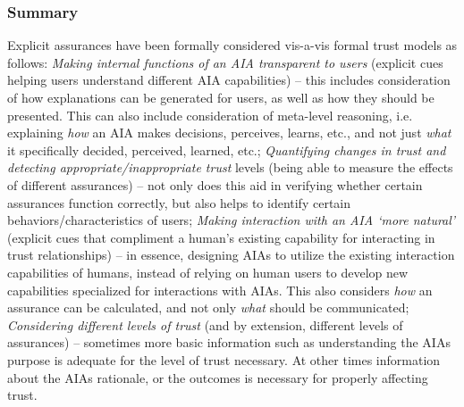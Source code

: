 \subsubsection{Summary}
Explicit assurances have been formally considered vis-a-vis formal trust models as follows: \textit{Making internal functions of an AIA transparent to users} (explicit cues helping users understand different AIA capabilities) -- this includes consideration of how explanations can be generated for users, as well as how they should be presented. This can also include consideration of meta-level reasoning, i.e. explaining \textit{how} an AIA makes decisions, perceives, learns, etc., and not just \textit{what} it specifically decided, perceived, learned, etc.; 
\textit{Quantifying changes in trust and detecting appropriate/inappropriate trust} levels (being able to measure the effects of different assurances) -- not only does this aid in verifying whether certain assurances function correctly, but also helps to identify certain behaviors/characteristics of users; 
\textit{Making interaction with an AIA `more natural'} (explicit cues that compliment a human's existing capability for interacting in trust relationships) -- in essence, designing AIAs to utilize the existing interaction capabilities of humans, instead of relying on human users to develop new capabilities specialized for interactions with AIAs. This also considers \emph{how} an assurance can be calculated, and not only \emph{what} should be communicated; 
\textit{Considering different levels of trust} (and by extension, different levels of assurances) -- sometimes more basic information such as understanding the AIAs purpose is adequate for the level of trust necessary. At other times information about the AIAs rationale, or the outcomes is necessary for properly affecting trust.

